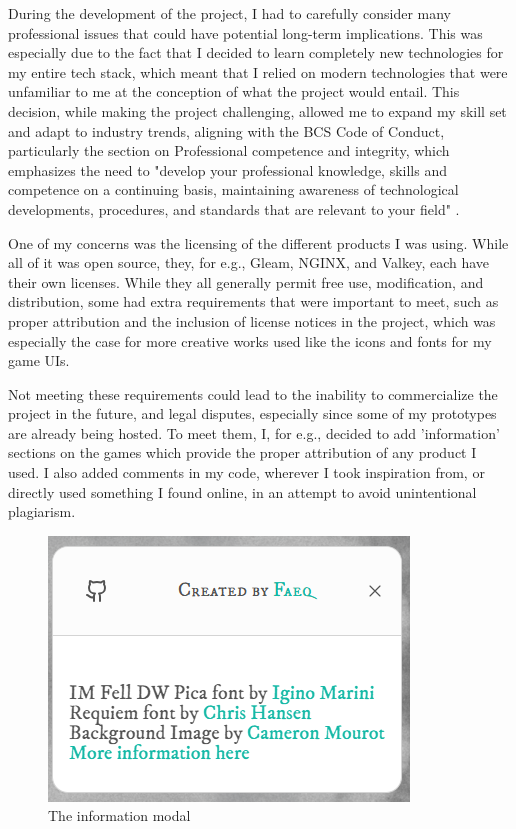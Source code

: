 \documentclass[]{final}
\begin{document}
During the development of the project, I had to carefully consider many
professional issues that could have potential long-term implications.
This was especially due to the fact that I decided to learn completely
new technologies for my entire tech stack, which meant that I relied
on modern technologies that were unfamiliar to me at the conception of what
the project would entail. This decision, while making the project challenging,
allowed me to expand my skill set and adapt to industry trends,
aligning with the BCS Code of Conduct, particularly the section on
Professional competence and integrity, which emphasizes the need to
"develop your professional knowledge, skills and competence on a continuing
basis, maintaining awareness of technological developments, procedures,
and standards that are relevant to your field" \cite{noauthor_bcs_nodate}.


One of my concerns was the licensing of the different products I was using.
While all of it was open source, they, for e.g., Gleam, NGINX, and Valkey,
each have their own licenses.
While they all generally permit free use, modification, and distribution,
some had extra requirements that were important to meet,
such as proper attribution and the inclusion of license notices in
the project, which was especially the case for more creative works used
like the icons and fonts for my game UIs.

Not meeting these requirements
could lead to the inability to commercialize the project
in the future, and legal disputes, especially since some of my prototypes are
already being hosted. To meet them, I, for e.g., decided to add 'information' sections on
the games which provide the proper attribution of any product I used. I
also added comments in my code, wherever I took inspiration from, or directly
used something I found online, in an attempt to avoid unintentional plagiarism.


\begin{figure}[H]
  \centering
  \includegraphics[width=.3\linewidth]{info_modal.png}
  \caption{The information modal}
\end{figure}
\end{document}

